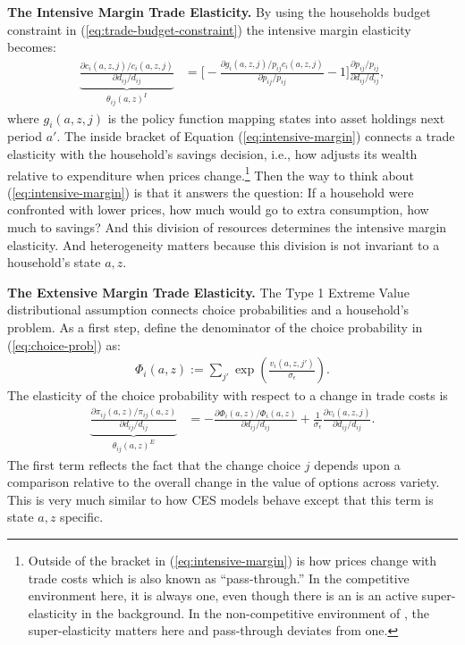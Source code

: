 \documentclass[12pt,pdftex]{article}
\begin{document}
\begin{onehalfspacing}
\textbf{The Intensive Margin Trade Elasticity.} By using the households budget constraint in (\ref{eq:trade-budget-constraint}) the intensive margin elasticity becomes:
\begin{align}
\underbrace{\frac{\partial c_{i}(a,z,j)/ c_{i}(a,z,j)}{\partial d_{ij} / d_{ij}}}_{\theta_{ij}(a,z)^{I}} &= \bigg [-\frac{\partial g_{i}(a,z,j)/ p_{ij}c_{i}(a,z,j)}{\partial p_{ij}/ p_{ij}} - 1 \bigg ]\frac{\partial p_{ij}/p_{ij}}{\partial d_{ij}/ d_{ij}} ,
\label{eq:intensive-margin}
\end{align}
where $g_{i}(a,z,j)$ is the policy function mapping states into asset holdings next period $a'$. The inside bracket of Equation (\ref{eq:intensive-margin}) connects a trade elasticity with the household's savings decision, i.e., how adjusts its wealth relative to expenditure when prices change.\footnote{Outside of the bracket in (\ref{eq:intensive-margin}) is how prices change with trade costs which is also known as ``pass-through.'' In the competitive environment here, it is always one, even though there is an is an active super-elasticity in the background. In the non-competitive environment of \citet{p-iq}, the super-elasticity matters here and pass-through deviates from one.} Then the way to think about (\ref{eq:intensive-margin})  is that it answers the question: If a household were confronted with lower prices, how much would go to extra consumption, how much to savings? And this division of resources determines the intensive margin elasticity. And heterogeneity matters because this division is not invariant to a household's state $a, z$.

\textbf{The Extensive Margin Trade Elasticity.} The Type 1 Extreme Value distributional assumption connects choice probabilities and a household's problem. As a first step, define the denominator of the choice probability in (\ref{eq:choice-prob}) as:
\begin{align}
\Phi_{i}(a,z) := \sum_{j'} \exp \left( \frac{ v_{i}(a, z, j') }{\sigma_{\epsilon}} \right).
\end{align}
The elasticity of the choice probability with respect to a change in trade costs is
\begin{align}
\underbrace{ \frac{\partial \pi_{ij}(a,z) / \pi_{ij}(a,z)}{\partial d_{ij} / d_{ij}} }_{\theta_{ij}(a,z)^{E}} &= - \frac{\partial \Phi_{i}(a,z) / \Phi_{i}(a,z)}{\partial d_{ij}/d_{ij}} + \frac{1}{\sigma_{\epsilon}}\frac{\partial v_{i}(a,z,j)}{\partial d_{ij}/d_{ij}} .
\label{eq:extensive-margin}
\end{align}
The first term reflects the fact that the change choice $j$ depends upon a comparison relative to the overall change in the value of options across variety. This is very much similar to how CES models behave except that this term is state $a,z$ specific.


\end{onehalfspacing}
\end{document}
